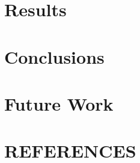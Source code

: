 \documentclass{article}
\begin{document}
\section{Results}
\label{sec:results}

\section{Conclusions}
\label{sec:concl}


\section{Future Work}
\label{sec:print}



\section{REFERENCES}
\label{sec:ref}




\end{document}
